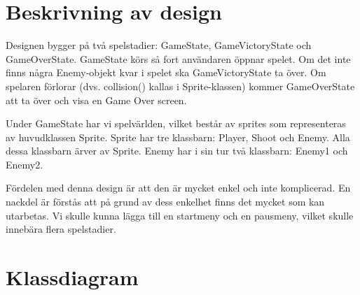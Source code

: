 \documentclass{TDP005mall}
\begin{document}
\section{Beskrivning av design}
Designen bygger på två spelstadier: GameState, GameVictoryState och GameOverState. GameState körs så fort användaren öppnar spelet. Om det inte finns några Enemy-objekt kvar i spelet ska GameVictoryState ta över. Om spelaren förlorar (dvs. collision() kallas i Sprite-klassen) kommer GameOverState att ta över och visa en Game Over screen.

Under GameState har vi spelvärlden, vilket består av sprites som representeras av huvudklassen Sprite. Sprite har tre klassbarn: Player, Shoot och Enemy. Alla dessa klassbarn ärver av Sprite. Enemy har i sin tur två klassbarn: Enemy1 och Enemy2.

Fördelen med denna design är att den är mycket enkel och inte komplicerad. En nackdel är förstås att på grund av dess enkelhet finns det mycket som kan utarbetas. Vi skulle kunna lägga till en startmeny och en pausmeny, vilket skulle innebära flera spelstadier. 

\section{Klassdiagram}
\center
{}
\end{document}
